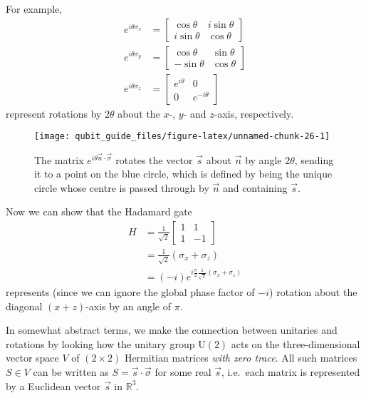 \documentclass[fleqn]{article}
\begin{document}
For example,
\[
  \begin{aligned}
    e^{i\theta\sigma_x}
    &=
    \begin{bmatrix}
      \cos\theta & i\sin\theta
    \\i\sin\theta & \cos\theta
    \end{bmatrix}
  \\e^{i\theta\sigma_y}
    &=
    \begin{bmatrix}
      \cos\theta & \sin\theta
    \\-\sin\theta & \cos\theta
    \end{bmatrix}
  \\e^{i\theta\sigma_z}
    &= \begin{bmatrix}e^{i\theta}&0\\0&e^{-i\theta}\end{bmatrix}
  \end{aligned}
\]
represent rotations by \(2\theta\) about the \(x\)-, \(y\)- and \(z\)-axis, respectively.



\begin{figure}[H]

{\centering \texttt{[image: qubit\_guide\_files/figure-latex/unnamed-chunk-26-1]} 

}

\caption{The matrix \(e^{i\theta\vec{n}\cdot\vec{\sigma}}\) rotates the vector \(\vec{s}\) about \(\vec{n}\) by angle \(2\theta\), sending it to a point on the blue circle, which is defined by being the unique circle whose centre is passed through by \(\vec{n}\) and containing \(\vec{s}\).}\label{fig:unnamed-chunk-26}
\end{figure}

Now we can show that the Hadamard gate
\[
  \begin{aligned}
    H
    &= \frac{1}{\sqrt{2}}
    \begin{bmatrix}
      1& 1
    \\1 & -1
    \end{bmatrix}
  \\&= \frac{1}{\sqrt{2}}(\sigma_x + \sigma_z)
  \\&= (-i)e^{i \frac{\pi}{2} \frac{1}{\sqrt{2}}(\sigma_x+\sigma_z)}
  \end{aligned}
\]
represents (since we can ignore the global phase factor of \(-i\)) rotation about the diagonal \((x+z)\)-axis by an angle of \(\pi\).

In somewhat abstract terms, we make the connection between unitaries and rotations by looking how the unitary group \(\mathrm{U}(2)\) acts on the three-dimensional vector space \(V\) of \((2\times 2)\) Hermitian matrices \emph{with zero trace}.
All such matrices \(S\in V\) can be written as \(S=\vec{s}\cdot\vec{\sigma}\) for some real \(\vec{s}\), i.e.~each matrix is represented by a Euclidean vector \(\vec{s}\) in \(\mathbb{R}^3\).
\end{document}
